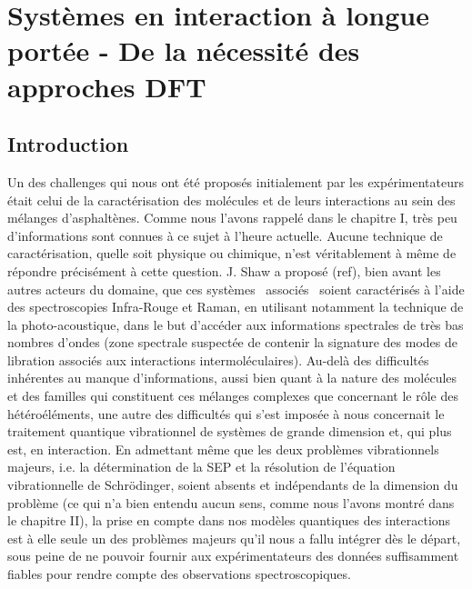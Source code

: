 	\chapter[longue portee]{Systèmes en interaction à longue portée - De la nécessité des approches DFT}
	\minitoc
	\restoregeometry
	
	\newpage
	
	\section*{Introduction}
	
	Un des challenges qui nous ont été proposés initialement par les expérimentateurs était celui de la caractérisation des molécules et de leurs interactions au sein des mélanges d’asphaltènes. Comme nous l’avons rappelé dans le chapitre I, très peu d’informations sont connues à ce sujet à l’heure actuelle. Aucune technique de caractérisation, quelle soit physique ou chimique, n’est véritablement à même de répondre précisément à cette question. J. Shaw a proposé (ref), bien avant les autres acteurs du domaine, que ces systèmes \og associés \fg{} soient caractérisés à l’aide des spectroscopies Infra-Rouge et Raman, en utilisant notamment la technique de la photo-acoustique, dans le but d’accéder aux informations spectrales de très bas nombres d’ondes (zone spectrale suspectée de contenir la signature des modes de libration associés aux interactions intermoléculaires). Au-delà des difficultés inhérentes au manque d’informations, aussi bien quant à la nature des molécules et des familles qui constituent ces mélanges complexes que concernant le rôle des hétéroéléments, une autre des difficultés qui s’est imposée à nous concernait le traitement quantique vibrationnel de systèmes de grande dimension et, qui plus est, en interaction. En admettant même que les deux problèmes vibrationnels majeurs, i.e. la détermination de la SEP et la résolution de l’équation vibrationnelle de Schr\"{o}dinger, soient absents et indépendants de la dimension du problème (ce qui n’a bien entendu aucun sens, comme nous l’avons montré dans le chapitre II), la prise en compte dans nos modèles quantiques des interactions est à elle seule un des problèmes majeurs qu’il nous a fallu intégrer dès le départ, sous peine de ne pouvoir fournir aux expérimentateurs des données suffisamment fiables pour rendre compte des observations spectroscopiques. 
	
